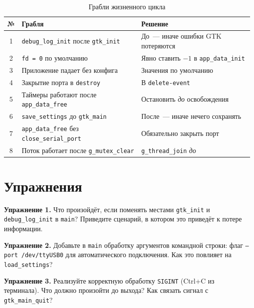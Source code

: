 \begin{table}[htbp]
\centering
\caption{Грабли жизненного цикла}
\label{tab:lifecycle-pitfalls}
\small
\begin{tabularx}{\textwidth}{@{}c L L@{}}
\toprule
\textbf{№} & \textbf{Грабля} & \textbf{Решение} \\
 & \texttt{debug\_log\_init} после \texttt{gtk\_init} & До~--- иначе ошибки GTK потеряются \\
2 & \texttt{fd = 0} по умолчанию & Явно ставить $-1$ в \texttt{app\_data\_init} \\
3 & Приложение падает без конфига & Значения по умолчанию \\
4 & Закрытие порта в \texttt{destroy} & В \texttt{delete-event} \\
5 & Таймеры работают после \texttt{app\_data\_free} & Остановить \emph{до} освобождения \\
6 & \texttt{save\_settings} до \texttt{gtk\_main} & После~--- иначе нечего сохранять \\
7 & \texttt{app\_data\_free} без \texttt{close\_serial\_port} & Обязательно закрыть порт \\
8 & Поток работает после \texttt{g\_mutex\_clear} & \texttt{g\_thread\_join} \emph{до} \\
\bottomrule
\end{tabularx}
\end{table}

\section{Упражнения}
\label{sec:lifecycle-exercises}

\begin{exercisebox}
\textbf{Упражнение 1.} Что произойдёт, если поменять местами
\texttt{gtk\_init} и \texttt{debug\_log\_init} в \texttt{main}?
Приведите сценарий, в котором это приведёт к потере
информации.
\end{exercisebox}

\begin{exercisebox}
\textbf{Упражнение 2.} Добавьте в \texttt{main} обработку
аргументов командной строки: флаг \texttt{--port /dev/ttyUSB0}
для автоматического подключения. Как это повлияет на
\texttt{load\_settings}?
\end{exercisebox}

\begin{exercisebox}
\textbf{Упражнение 3.} Реализуйте корректную обработку
\texttt{SIGINT} (Ctrl+C из терминала). Что должно произойти
до выхода? Как связать сигнал с \texttt{gtk\_main\_quit}?
\end{exercisebox}

